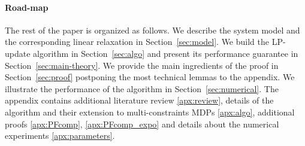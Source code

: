\paragraph{Road-map} The rest of the paper is organized as follows. We describe the system model and the corresponding linear relaxation in Section~\ref{sec:model}. We build the LP-update algorithm in Section~\ref{sec:algo} and present its performance guarantee in Section~\ref{sec:main-theory}.  We provide the main ingredients of the proof in Section~\ref{sec:proof} postponing the most technical lemmas to the appendix.  We illustrate the performance of the algorithm in Section~\ref{sec:numerical}. The appendix contains additional literature review \ref{apx:review}, details of the algorithm and their extension to multi-constraints MDPs \ref{apx:algo}, additional proofs \ref{apx:PFcomp}, \ref{apx:PFcomp_expo} and details about the numerical experiments \ref{apx:parameters}.



